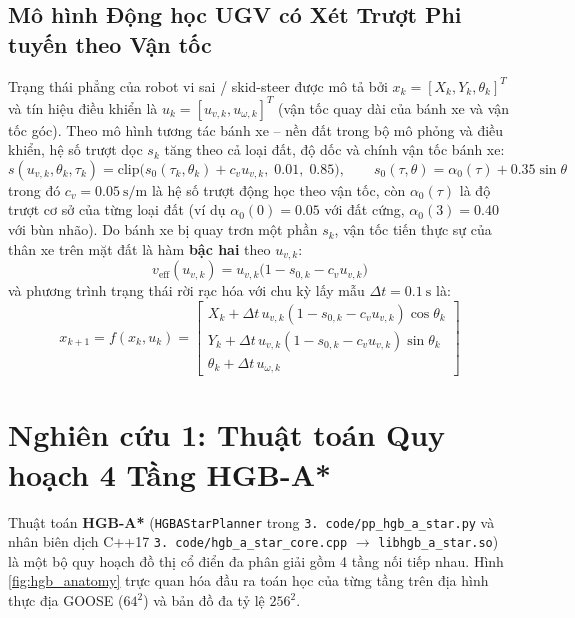 \documentclass[12pt, a4paper]{article}
\begin{document}
\subsection{Mô hình Động học UGV có Xét Trượt Phi tuyến theo Vận tốc}
Trạng thái phẳng của robot vi sai / skid-steer được mô tả bởi $x_k = [X_k, Y_k, \theta_k]^T$ và tín hiệu điều khiển là $u_k = [u_{v,k}, u_{\omega,k}]^T$ (vận tốc quay dài của bánh xe và vận tốc góc). Theo mô hình tương tác bánh xe -- nền đất trong bộ mô phỏng và điều khiển, hệ số trượt dọc $s_k$ tăng theo cả loại đất, độ dốc và chính vận tốc bánh xe:
\begin{equation}
    s(u_{v,k}, \theta_k, \tau_k) = \text{clip}\big( s_0(\tau_k, \theta_k) + c_v u_{v,k},\; 0.01,\; 0.85 \big), \qquad s_0(\tau, \theta) = \alpha_0(\tau) + 0.35 \sin\theta
    \label{eq:slip_physics}
\end{equation}
trong đó $c_v = 0.05\ \text{s/m}$ là hệ số trượt động học theo vận tốc, còn $\alpha_0(\tau)$ là độ trượt cơ sở của từng loại đất (ví dụ $\alpha_0(0)=0.05$ với đất cứng, $\alpha_0(3)=0.40$ với bùn nhão). Do bánh xe bị quay trơn một phần $s_k$, vận tốc tiến thực sự của thân xe trên mặt đất là hàm \textbf{bậc hai} theo $u_{v,k}$:
\begin{equation}
    v_{\text{eff}}(u_{v,k}) = u_{v,k}\big(1 - s_{0,k} - c_v u_{v,k}\big)
    \label{eq:veff_quad}
\end{equation}
và phương trình trạng thái rời rạc hóa với chu kỳ lấy mẫu $\Delta t = 0.1\ \text{s}$ là:
\begin{equation}
    x_{k+1} = f(x_k, u_k) = \begin{bmatrix}
        X_k + \Delta t \, u_{v,k}(1 - s_{0,k} - c_v u_{v,k})\cos\theta_k \\
        Y_k + \Delta t \, u_{v,k}(1 - s_{0,k} - c_v u_{v,k})\sin\theta_k \\
        \theta_k + \Delta t \, u_{\omega,k}
    \end{bmatrix}
    \label{eq:ugv_kinematics}
\end{equation}

\section{Nghiên cứu 1: Thuật toán Quy hoạch 4 Tầng HGB-A*}
Thuật toán \textbf{HGB-A*} (\texttt{HGBAStarPlanner} trong \texttt{3. code/pp\_hgb\_a\_star.py} và nhân biên dịch C++17 \texttt{3. code/hgb\_a\_star\_core.cpp} $\to$ \texttt{libhgb\_a\_star.so}) là một bộ quy hoạch đồ thị cổ điển đa phân giải gồm 4 tầng nối tiếp nhau. Hình \ref{fig:hgb_anatomy} trực quan hóa đầu ra toán học của từng tầng trên địa hình thực địa GOOSE ($64^2$) và bản đồ đa tỷ lệ $256^2$.
\end{document}
